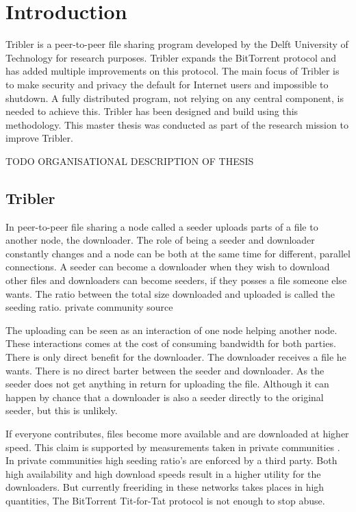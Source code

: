 \chapter{Introduction}
\label{chp:introduction}
Tribler is a peer-to-peer file sharing program developed by the Delft University of Technology for research purposes.
Tribler expands the BitTorrent protocol and has added multiple improvements on this protocol.
The main focus of Tribler is to make security and privacy the default for Internet users and impossible to shutdown.
A fully distributed program, not relying on any central component, is needed to achieve this.
Tribler has been designed and build using this methodology\cite{Pouwelse-tribler}\cite{Bakker-tribler}.
This master thesis was conducted as part of the research mission to improve Tribler.

\vspace{1\baselineskip}

\noindent
TODO ORGANISATIONAL DESCRIPTION OF THESIS

\section{Tribler}
In peer-to-peer file sharing a node called a seeder uploads parts
of a file to another node, the downloader.
The role of being a seeder and downloader constantly changes
and a node can be both at the same time for different, parallel connections.
A seeder can become a downloader when they wish to download other files
and downloaders can become seeders,
if they posses a file someone else wants.
The ratio between the total size downloaded and uploaded is called the seeding ratio\cite{Cohen-bittorrent}.
private community source

The uploading can be seen as an interaction of one node helping another node.
These interactions comes at the cost of consuming bandwidth for both parties.
There is only direct benefit for the downloader.
The downloader receives a file he wants.
There is no direct barter between the seeder and downloader.
As the seeder does not get anything in return for uploading the file.
Although it can happen by chance that a downloader is also a seeder directly to the original seeder,
but this is unlikely\cite{Lai-Incentives}.

If everyone contributes, files become more available and are downloaded at higher speed.
This claim is supported by measurements taken in private communities
\cite{meulpolder-privatecommunities}.
In private communities high seeding ratio's are enforced by a third party.
Both high availability and high download speeds result in a higher utility for the downloaders.
But currently freeriding in these networks takes places in high quantities\cite{Adar-Freeriding},
The BitTorrent Tit-for-Tat protocol is not enough to stop abuse\cite{Pouwelse-tribler}.

